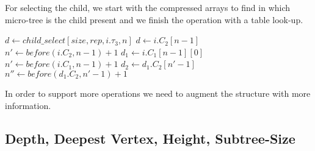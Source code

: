 For selecting the child, we start with the compressed arrays to find in which micro-tree is the child present and we finish the operation with a table look-up.

\begin{algorithmic}
		\State $d \gets child\_select[size, rep, i.\tau_3, n]$
		\State {}
		\State $d \gets i.C_2[n - 1]$
		\State $n' \gets before(i.C_2, n - 1) + 1$
		 
			\State {}
		\Else {}
			\State {}
		\EndIf
	\Else
		\State $d_1 \gets i.C_1[n - 1][0]$ 
		\State $n' \gets before(i.C_1, n - 1) + 1$
		 
			\State $d_2 \gets d_1.C_2[n' - 1]$
			\State $n'' \gets before(d_1.C_2, n' - 1) + 1$
			 
				\State {}
			\Else {}
				\State {}
			\EndIf
		\Else {}
			\State {}
		\EndIf
	\EndIf
\EndFunction
\end{algorithmic}

\bigskip

In order to support more operations we need to augment the structure with more information.

\subsection{Depth, Deepest Vertex, Height, Subtree-Size}

